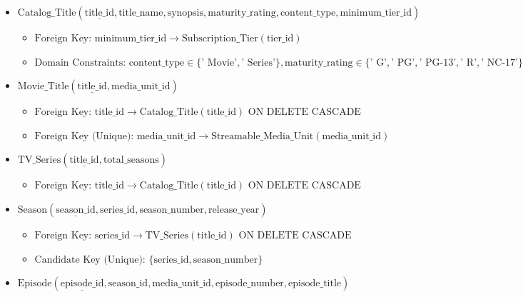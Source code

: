 \begin{itemize}
\item
  \(\text{Catalog\_Title}(\underline{\text{title\_id}},\allowbreak   \text{title\_name},\allowbreak   \text{synopsis},\allowbreak   \text{maturity\_rating},\allowbreak   \text{content\_type},\allowbreak   \text{minimum\_tier\_id})\)

  \begin{itemize}
  \item
    \(\text{Foreign Key: } \text{minimum\_tier\_id} \to \text{Subscription\_Tier}(\text{tier\_id})\)
  \item
    \(\text{Domain Constraints: } \text{content\_type} \in \{\text{' Movie'},\allowbreak   \text{' Series'}\},\allowbreak   \text{maturity\_rating} \in \{\text{' G'},\allowbreak   \text{' PG'},\allowbreak   \text{' PG-13'},\allowbreak   \text{' R'},\allowbreak   \text{' NC-17'}\}\)
  \end{itemize}
\item
  \(\text{Movie\_Title}(\underline{\text{title\_id}},\allowbreak   \text{media\_unit\_id})\)

  \begin{itemize}
  \item
    \(\text{Foreign Key: } \text{title\_id} \to \text{Catalog\_Title}(\text{title\_id}) \text{ ON DELETE CASCADE}\)
  \item
    \(\text{Foreign Key (Unique): } \text{media\_unit\_id} \to \text{Streamable\_Media\_Unit}(\text{media\_unit\_id})\)
  \end{itemize}
\item
  \(\text{TV\_Series}(\underline{\text{title\_id}},\allowbreak   \text{total\_seasons})\)

  \begin{itemize}
  \item
    \(\text{Foreign Key: } \text{title\_id} \to \text{Catalog\_Title}(\text{title\_id}) \text{ ON DELETE CASCADE}\)
  \end{itemize}
\item
  \(\text{Season}(\underline{\text{season\_id}},\allowbreak   \text{series\_id},\allowbreak   \text{season\_number},\allowbreak   \text{release\_year})\)

  \begin{itemize}
  \item
    \(\text{Foreign Key: } \text{series\_id} \to \text{TV\_Series}(\text{title\_id}) \text{ ON DELETE CASCADE}\)
  \item
    \(\text{Candidate Key (Unique): } \{\text{series\_id},\allowbreak   \text{season\_number}\}\)
  \end{itemize}
\item
  \(\text{Episode}(\underline{\text{episode\_id}},\allowbreak   \text{season\_id},\allowbreak   \text{media\_unit\_id},\allowbreak   \text{episode\_number},\allowbreak   \text{episode\_title})\)


\end{itemize}
